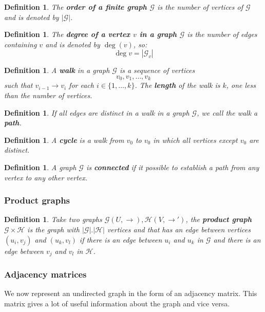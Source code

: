 \documentclass[a4paper,11pt]{report}
\newtheorem{definition}[theorem]{Definition}
\newcommand{\graf}{\mathscr{G}}
\newcommand{\grafeen}{\mathscr{H}}
\begin{document}
 
 
\begin{definition}
  The \textbf{order of a finite graph $\graf$} is the number of vertices of $\graf$ and is denoted by $|\graf|$.  
\end{definition} 
  
  \begin{definition}
    The \textbf{degree of a vertex $v$ in a graph $\graf$} is the number of edges 
    containing $v$ and is denoted by $\deg(v)$, so:
    $$\deg{v} = |\graf_v|$$
  \end{definition}
  
 
 \begin{definition}
   A  \textbf{walk} in a graph $\graf$ is a sequence of vertices
   $$v_0,v_1,\ldots,v_k$$
   such that $v_{i-1} \to v_i$ for each $i \in \{1,\ldots,k\}$. The \textbf{length} of the walk is $k$, one less
   than the number of vertices. 
 \end{definition}
 
 \begin{definition}
   If all edges are distinct in a  walk in a graph $\graf$, we call the walk a \textbf{path}.
 \end{definition}
 
 \begin{definition}
   A \textbf{cycle} is a walk from $v_0$ to $v_0$ in which all vertices except $v_0$ are distinct. \end{definition}
 
 \begin{definition}
   A graph $\graf$ is \textbf{connected} if it possible to establish a path from any 
   vertex to any other vertex.
    \end{definition}
 \subsubsection{Product graphs}
 \begin{definition}
   Take two graphs $\graf(U,\to), \grafeen(V,\to')$, the \textbf{product graph} $\graf \times \grafeen$ 
   is the graph with $|\graf|.|\grafeen|$ vertices and that has an edge between 
   vertices $(u_i, v_j)$ and $(u_k, v_l)$ if there is an edge between $u_i$ and $u_k$ in $\graf$ and there is an 
   edge between $v_j$ and $v_l$ in $\grafeen$. 
 \end{definition}
 \subsubsection{Adjacency matrices}
 We now represent an undirected graph in the form of an adjacency matrix. This 
 matrix gives a lot of useful information about the graph and vice versa.
 
\end{document}
